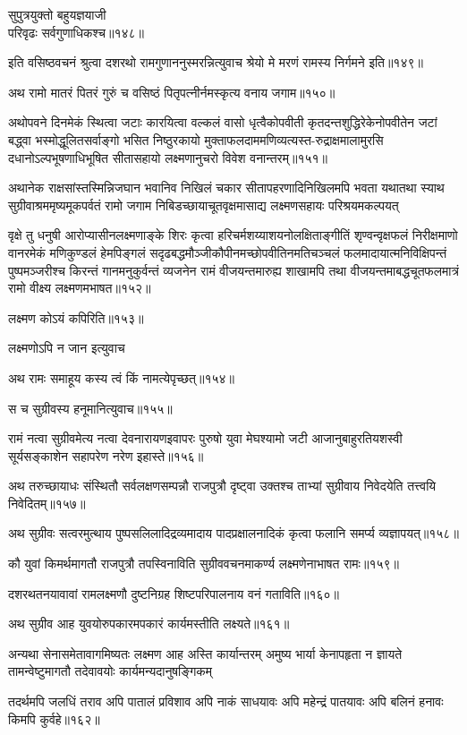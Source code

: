 \begin{flushleft}
सुपुत्रयुक्तो बहुयज्ञयाजी\\
परिवृढः सर्वगुणाधिकश्च॥१४८॥

इति वसिष्ठवचनं श्रुत्वा दशरथो रामगुणाननुस्मरन्नित्युवाच श्रेयो मे मरणं रामस्य निर्गमने इति॥१४९॥

अथ रामो मातरं पितरं गुरुं च वसिष्ठं पितृपत्नीर्नमस्कृत्य वनाय जगाम॥१५०॥

अथोपवने दिनमेकं स्थित्वा जटाः कारयित्वा वल्कलं वासो धृत्वैकोपवीती कृतदन्तशुद्धिरेकेनोपवीतेन जटां बद्ध्वा भस्मोद्धूलितसर्वाङ्गो भसित निष्ठुरकायो मुक्ताफलदाममणिव्यत्यस्त-रुद्राक्षमालामुरसि दधानोऽल्पभूषणाधिभूषित सीतासहायो लक्ष्मणानुचरो विवेश वनान्तरम्॥१५१॥

अथानेक राक्षसांस्तस्मिन्निजघान भवानिव निखिलं चकार सीतापहरणादिनिखिलमपि भवता यथातथा स्याथ सुग्रीवाश्रममृष्यमूकपर्वतं रामो जगाम निबिडच्छायाचूतवृक्षमासाद्य लक्ष्मणसहायः परिश्रयमकल्पयत्

वृक्षे तु धनुषी आरोप्यासीनलक्ष्मणाङ्के शिरः कृत्वा हरिचर्मशय्याशयनोलक्षिताङ्गीतिं शृण्वन्वृक्षफलं निरीक्षमाणो वानरमेकं मणिकुण्डलं हेमपिङ्गलं सदृढबद्धमौञ्जीकौपीनमच्छोपवीतिनमतिचञ्चलं फलमादायात्मनिविक्षिपन्तं पुष्पमञ्जरीश्च किरन्तं गानमनुकुर्वन्तं व्यजनेन रामं वीजयन्तमारुह्य शाखामपि तथा वीजयन्तमाबद्धचूतफलमात्रं रामो वीक्ष्य लक्ष्मणमभाषत॥१५२॥

लक्ष्मण कोऽयं कपिरिति॥१५३॥

लक्ष्मणोऽपि न जान इत्युवाच

अथ रामः समाहूय कस्य त्वं किं नामत्येपृच्छत्॥१५४॥

स च सुग्रीवस्य हनूमानित्युवाच॥१५५॥

रामं नत्वा सुग्रीवमेत्य नत्वा देवनारायणइवापरः पुरुषो युवा मेघश्यामो जटी आजानुबाहुरतियशस्वी सूर्यसङ्काशेन सहापरेण नरेण इहास्ते॥१५६॥

अथ तरुच्छायाधः संस्थितौ सर्वलक्षणसम्पन्नौ राजपुत्रौ दृष्ट्वा उक्तश्च ताभ्यां सुग्रीवाय निवेदयेति तत्त्वयि निवेदितम्॥१५७॥

अथ सुग्रीवः सत्वरमुत्थाय पुष्पसलिलादिद्रव्यमादाय पादप्रक्षालनादिकं कृत्वा फलानि समर्प्य व्यज्ञापयत्॥१५८॥

कौ युवां किमर्थमागतौ राजपुत्रौ तपस्विनाविति सुग्रीववचनमाकर्ण्य लक्ष्मणेनाभाषत रामः॥१५९॥

दशरथतनयावावां रामलक्ष्मणौ दुष्टनिग्रह शिष्टपरिपालनाय वनं गताविति॥१६०॥

अथ सुग्रीव आह युवयोरुपकारमपकारं कार्यमस्तीति लक्ष्यते॥१६१॥

अन्यथा सेनासमेतावागमिष्यतः लक्ष्मण आह अस्ति कार्यान्तरम् अमुष्य भार्या केनापहृता न ज्ञायते तामन्वेष्टुमागतौ तदेवावयोः कार्यमन्यदानुषङ्गिकम्

तदर्थमपि जलधिं तराव अपि पातालं प्रविशाव अपि नाकं साधयावः अपि महेन्द्रं पातयावः अपि बलिनं हनावः किमपि कुर्वहे॥१६२॥


\end{flushleft}
